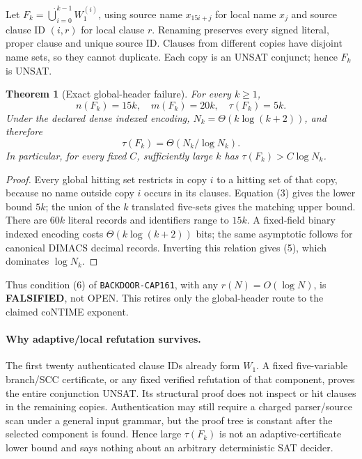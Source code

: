\documentclass[11pt]{article}
\newtheorem{theorem}{Theorem}
\newcommand{\status}[1]{\textbf{#1}}
\begin{document}
Let $F_k=\dot\bigcup_{i=0}^{k-1}W_1^{(i)}$, using source name
$x_{15i+j}$ for local name $x_j$ and source clause ID $(i,r)$ for local
clause $r$.  Renaming preserves every signed literal, proper clause and
unique source ID.  Clauses from different copies have disjoint name sets,
so they cannot duplicate.  Each copy is an UNSAT conjunct; hence $F_k$ is
UNSAT.

\begin{theorem}[Exact global-header failure]\label{th:product}
For every $k\ge1$,
\[
n(F_k)=15k,\quad m(F_k)=20k,\quad \tau(F_k)=5k.          \tag{4}
\]
Under the declared dense indexed encoding,
$N_k=\Theta(k\log(k+2))$, and therefore
\[
                 \tau(F_k)=\Theta(N_k/\log N_k).        \tag{5}
\]
In particular, for every fixed $C$, sufficiently large $k$ has
$\tau(F_k)>C\log N_k$.
\end{theorem}
\begin{proof}
Every global hitting set restricts in copy $i$ to a hitting set of that
copy, because no name outside copy $i$ occurs in its clauses.  Equation (3)
gives the lower bound $5k$; the union of the $k$ translated five-sets gives
the matching upper bound.  There are $60k$ literal records and identifiers
range to $15k$.  A fixed-field binary indexed encoding costs
$\Theta(k\log(k+2))$ bits; the same asymptotic follows for canonical DIMACS
decimal records.  Inverting this relation gives (5), which dominates
$\log N_k$.
\end{proof}

Thus condition (6) of \texttt{BACKDOOR-CAP161}, with any
$r(N)=O(\log N)$, is \status{FALSIFIED}, not OPEN.  This retires only the
global-header route to the claimed coNTIME exponent.

\paragraph{Why adaptive/local refutation survives.}
The first twenty authenticated clause IDs already form $W_1$.  A fixed
five-variable branch/SCC certificate, or any fixed verified refutation of
that component, proves the entire conjunction UNSAT.  Its structural proof
does not inspect or hit clauses in the remaining copies.  Authentication may
still require a charged parser/source scan under a general input grammar,
but the proof tree is constant after the selected component is found.  Hence
large $\tau(F_k)$ is not an adaptive-certificate lower bound and says nothing
about an arbitrary deterministic SAT decider.
\end{document}

